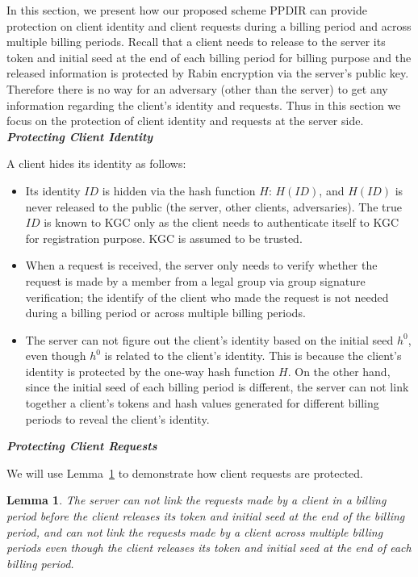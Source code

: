 \documentclass[letterpaper,12pt]{article}
\newtheorem{lemma}{Lemma}
\begin{document}
In this section, we present how our proposed scheme PPDIR can provide protection on client identity and client requests during a billing period and across multiple billing periods. Recall that a client needs to release to the server its token and initial seed at the end of each billing period for billing purpose and the released information is protected by Rabin encryption via the server's public key. Therefore there is no way for an adversary (other than the server) to get any information regarding the client's identity and requests. Thus in this section we focus on the protection of client identity and requests at the server side.
\textbf{\emph{
Protecting Client Identity}}

A client hides its identity as follows:
\begin{itemize}
\item Its identity $ID$ is hidden via the hash function $H$: $H(ID)$, and $H(ID)$ is never released to the public (the server, other clients, adversaries). The true $ID$ is known to KGC only as the client needs to authenticate itself to KGC for registration purpose. KGC is assumed to be trusted.

\item When a request is received, the server only needs to verify whether the request is made by a member from a legal group via group signature verification;  the identify of the client who made the request is not needed during a billing period or across multiple billing periods.

\item The server can not figure out the client's identity based on the initial seed $h^0$, even though $h^0$ is related to the client's identity. This is because  the client's identity is protected by the one-way hash function $H$. On the other hand, since the initial seed of each billing period is different, the server can not link together a client's tokens and hash values generated for different billing periods to reveal the client's identity.
\end{itemize}

\textbf{\emph{Protecting Client Requests}}

We will use Lemma~\ref{lemma:privacy:protection:multiple} to demonstrate how client requests are protected.

\begin{lemma} \label{lemma:privacy:protection:multiple}
The server can not link the requests made by a client in a billing period before the client releases its token and initial seed at the end of the billing period, and can not link the requests made by a client across multiple billing periods even though the client releases its token and initial seed at the end of each billing period.

\end{lemma}
\end{document}
